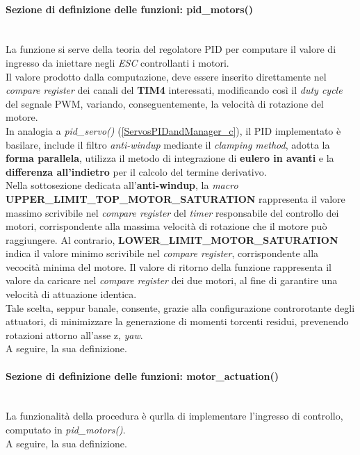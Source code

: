 \paragraph{Sezione di definizione delle funzioni: pid\_motors()}\mbox{}\\
La funzione si serve della teoria del regolatore PID per computare il valore di ingresso da iniettare negli \textit{ESC} controllanti i motori.\\
Il valore prodotto dalla computazione, deve essere inserito direttamente nel \textit{compare register} dei canali del \textbf{TIM4} interessati, modificando così il \textit{duty cycle}
del segnale PWM, variando, conseguentemente, la velocità di rotazione del motore.\\
In analogia a \textit{pid\_servo()} (\ref{ServosPIDandManager_c}), il PID implementato è basilare, include il filtro \textit{anti-windup} mediante il \textit{clamping method}, adotta la \textbf{forma parallela}, utilizza il metodo di integrazione di \textbf{eulero in avanti} e la \textbf{differenza all'indietro} per il calcolo del termine derivativo.\\
Nella sottosezione dedicata all'\textbf{anti-windup}, la \textit{macro} \textbf{UPPER\_LIMIT\_TOP\_MOTOR\_SATURATION} rappresenta il valore massimo scrivibile nel \textit{compare register} del \textit{timer} responsabile del controllo dei motori, corrispondente alla massima velocità di rotazione che il motore può raggiungere.
Al contrario, \textbf{LOWER\_LIMIT\_MOTOR\_SATURATION} indica il valore minimo scrivibile nel \textit{compare register}, corrispondente alla vecocità minima del motore.
Il valore di ritorno della funzione rappresenta il valore da caricare nel \textit{compare register} dei due motori, al fine di garantire una velocità di attuazione identica.\\
Tale scelta, seppur banale, consente, grazie alla configurazione controrotante degli attuatori, di minimizzare la generazione di momenti torcenti residui, prevenendo rotazioni attorno all'asse z, \textit{yaw}.\\
A seguire, la sua definizione.


\paragraph{Sezione di definizione delle funzioni: motor\_actuation()}\mbox{}\\
La funzionalità della procedura è qurlla di implementare l'ingresso di controllo, computato in \textit{pid\_motors()}.\\
A seguire, la sua definizione.\\


